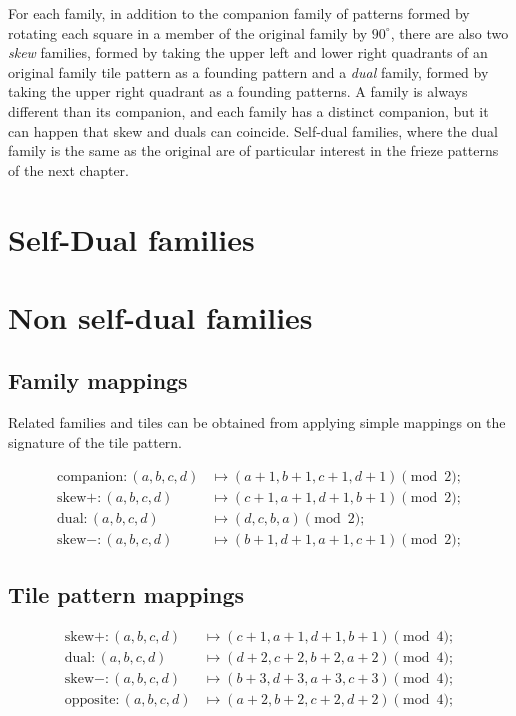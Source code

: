 \documentclass{tufte-book}
\begin{document}
\noindent
For each family, in addition to the companion family of patterns formed by rotating each square in a member of the original family by $90^{\circ}$,  there are also two \textit{skew} families, formed by taking the upper left and lower right quadrants of an original family tile pattern as a founding pattern and a \textit{dual} family, formed by taking the upper right quadrant as a founding patterns. A family is always different than its companion, and each family has a distinct companion, but it can happen that skew and duals can coincide. Self-dual families, where the dual family is the same as the original are of particular interest in the frieze patterns of the next chapter.

\section{Self-Dual families}


\section{Non self-dual families}


\newpage


\subsection{Family mappings}
\marginnote{\centering} Related families and tiles can be obtained from applying simple mappings on the signature of the tile pattern.

\begin{align*}        \text{companion}: (a,b,c,d) &\mapsto (a+1, b+1, c+ 1, d+1) \pmod{2};\\
    \text{skew}+ : (a,b,c,d) &\mapsto (c+1, a+1, d+ 1, b+1) \pmod{2};\\
    \text{dual} : (a,b,c,d) &\mapsto (d, c, b, a) \pmod{2};\\
    \text{skew}- : (a,b,c,d) &\mapsto (b+1, d+1, a+ 1, c+1) \pmod{2};
\end{align*}

\subsection{Tile pattern mappings}
\marginnote{\centering}
\begin{align*}        
    \text{skew}+ : (a,b,c,d) &\mapsto (c+1, a+1, d+ 1, b+1) \pmod{4};\\
    \text{dual} : (a,b,c,d) &\mapsto (d+2, c+2, b+ 2, a+2) \pmod{4};\\
    \text{skew}- : (a,b,c,d) &\mapsto (b+3, d+3, a+ 3, c+3) \pmod{4};\\
    \text{opposite} : (a,b,c,d) &\mapsto (a+2, b+2, c+2, d+2) \pmod{4};
\end{align*}
\end{document}
